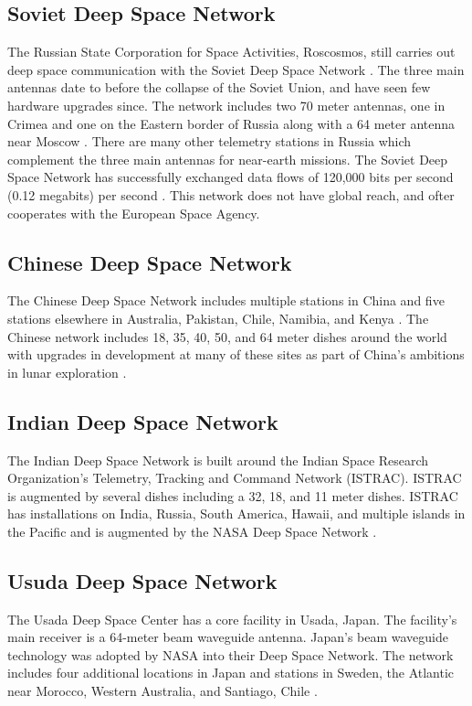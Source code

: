 \documentclass[sigconf]{acmart}
\begin{document}
\subsection{Soviet Deep Space Network}
The Russian State Corporation for Space Activities, Roscosmos, still carries out deep space communication with the Soviet Deep Space Network \cite{Mitchell2003}. The three main antennas date to before the collapse of the Soviet Union, and have seen few hardware upgrades since. The network includes two 70 meter antennas, one in Crimea and one on the Eastern border of Russia along with a 64 meter antenna near Moscow \cite{revolvy2012}. There are many other telemetry stations in Russia which complement the three main antennas for near-earth missions. The Soviet Deep Space Network has successfully exchanged data flows of 120,000 bits per second (0.12 megabits) per second \cite{revolvy2012}. This network does not have global reach, and ofter cooperates with the European Space Agency. 


\subsection{Chinese Deep Space Network}
The Chinese Deep Space Network includes multiple stations in China and five stations elsewhere in Australia, Pakistan, Chile, Namibia, and Kenya \cite{2011}. The Chinese network includes 18, 35, 40, 50, and 64 meter dishes around the world with upgrades in development at many of these sites as part of China's ambitions in lunar exploration \cite{Luan2015}. 


\subsection{Indian Deep Space Network}
The Indian Deep Space Network is built around the Indian Space Research Organization's Telemetry, Tracking and Command Network (ISTRAC). ISTRAC is augmented by several dishes including a 32, 18, and 11 meter dishes. ISTRAC has installations on India, Russia, South America, Hawaii, and multiple islands in the Pacific and is augmented by the NASA Deep Space Network \cite{Network2012}. 

\subsection{Usuda Deep Space Network}
The Usada Deep Space Center has a core facility in Usada, Japan. The facility's main receiver is a 64-meter beam waveguide antenna. Japan's beam waveguide technology was adopted by NASA into their Deep Space Network. The network includes four additional locations in Japan and stations in Sweden, the Atlantic near Morocco, Western Australia, and Santiago, Chile \cite{Sakushi17}. 
\end{document}
